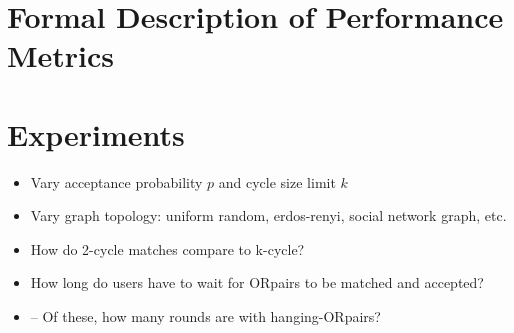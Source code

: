 \documentclass[main.tex]{subfiles}
\begin{document}
\section{Formal Description of Performance Metrics}

\section{Experiments}

\begin{itemize}
  \item Vary acceptance probability $p$ and cycle size limit $k$
  \item Vary graph topology: uniform random, erdos-renyi, social network graph, etc.
  \item How do 2-cycle matches compare to k-cycle?
  \item How long do users have to wait for ORpairs to be matched and accepted?
  \item -- Of these, how many rounds are with hanging-ORpairs?
\end{itemize}
\end{document}
